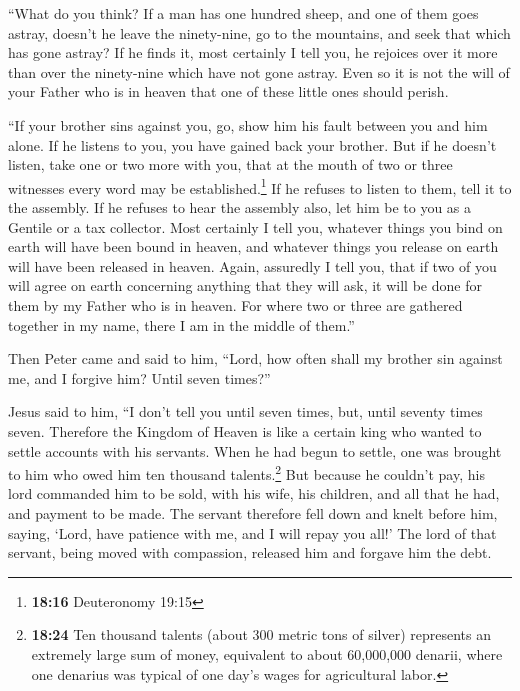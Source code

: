 ``What do you think? If a man has one hundred sheep, and
one of them goes astray, doesn't he leave the ninety-nine, go to the
mountains, and seek that which has gone astray?  If he
finds it, most certainly I tell you, he rejoices over it more than over
the ninety-nine which have not gone astray.  Even so it
is not the will of your Father who is in heaven that one of these little
ones should perish.

 ``If your brother sins against you, go, show him his
fault between you and him alone. If he listens to you, you have gained
back your brother.  But if he doesn't listen, take one or
two more with you, that at the mouth of two or three witnesses every
word may be established.\footnote{\textbf{18:16} Deuteronomy 19:15}
 If he refuses to listen to them, tell it to the
assembly. If he refuses to hear the assembly also, let him be to you as
a Gentile or a tax collector.  Most certainly I tell you,
whatever things you bind on earth will have been bound in heaven, and
whatever things you release on earth will have been released in heaven.
 Again, assuredly I tell you, that if two of you will
agree on earth concerning anything that they will ask, it will be done
for them by my Father who is in heaven.  For where two or
three are gathered together in my name, there I am in the middle of
them.''

 Then Peter came and said to him, ``Lord, how often shall
my brother sin against me, and I forgive him? Until seven times?''

 Jesus said to him, ``I don't tell you until seven times,
but, until seventy times seven.  Therefore the Kingdom of
Heaven is like a certain king who wanted to settle accounts with his
servants.  When he had begun to settle, one was brought
to him who owed him ten thousand talents.\footnote{\textbf{18:24} Ten
  thousand talents (about 300 metric tons of silver) represents an
  extremely large sum of money, equivalent to about 60,000,000 denarii,
  where one denarius was typical of one day's wages for agricultural
  labor.}  But because he couldn't pay, his lord
commanded him to be sold, with his wife, his children, and all that he
had, and payment to be made.  The servant therefore fell
down and knelt before him, saying, `Lord, have patience with me, and I
will repay you all!'  The lord of that servant, being
moved with compassion, released him and forgave him the debt.

